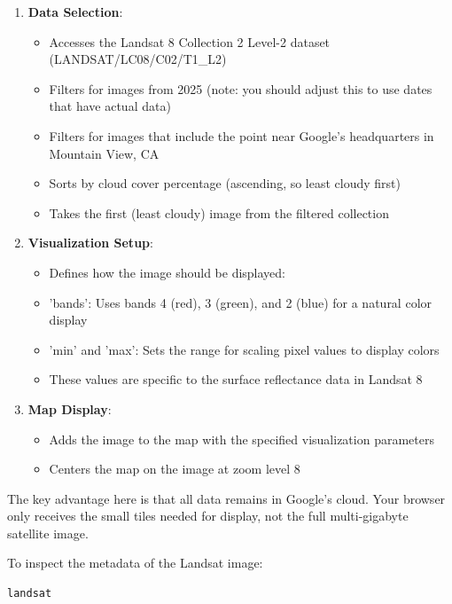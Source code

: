 \begin{enumerate}
\item \textbf{Data Selection}:
   \begin{itemize}
   \item Accesses the Landsat 8 Collection 2 Level-2 dataset (LANDSAT/LC08/C02/T1\_L2)
   \item Filters for images from 2025 (note: you should adjust this to use dates that have actual data)
   \item Filters for images that include the point near Google's headquarters in Mountain View, CA
   \item Sorts by cloud cover percentage (ascending, so least cloudy first)
   \item Takes the first (least cloudy) image from the filtered collection
   \end{itemize}

\item \textbf{Visualization Setup}:
   \begin{itemize}
   \item Defines how the image should be displayed:
   \item 'bands': Uses bands 4 (red), 3 (green), and 2 (blue) for a natural color display
   \item 'min' and 'max': Sets the range for scaling pixel values to display colors
   \item These values are specific to the surface reflectance data in Landsat 8
   \end{itemize}

\item \textbf{Map Display}:
   \begin{itemize}
   \item Adds the image to the map with the specified visualization parameters
   \item Centers the map on the image at zoom level 8
   \end{itemize}
\end{enumerate}

The key advantage here is that all data remains in Google's cloud. Your browser only receives the small tiles needed for display, not the full multi-gigabyte satellite image.

To inspect the metadata of the Landsat image:

\begin{lstlisting}[language=Python]
landsat
\end{lstlisting}


